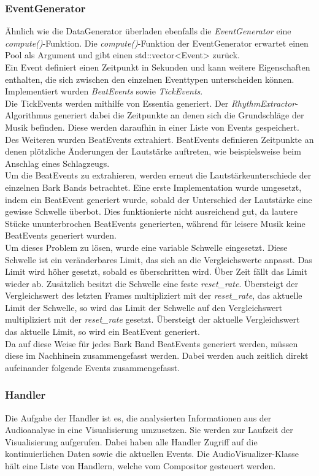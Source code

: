 \documentclass[11pt,a4paper]{article}
\begin{document}
\subsubsection{EventGenerator}
Ähnlich wie die DataGenerator überladen ebenfalls die \textit{EventGenerator} eine \textit{compute()}-Funktion. Die \textit{compute()}-Funktion der EventGenerator erwartet einen Pool als Argument und gibt einen std::vector<Event> zurück.\\
Ein Event definiert einen Zeitpunkt in Sekunden und kann weitere Eigenschaften enthalten, die sich zwischen den einzelnen Eventtypen unterscheiden können. Implementiert wurden \textit{BeatEvents} sowie \textit{TickEvents}.\\
Die TickEvents werden mithilfe von Essentia generiert. Der \textit{RhythmExtractor}-Algorithmus generiert dabei die Zeitpunkte an denen sich die Grundschläge der Musik befinden. Diese werden daraufhin in einer Liste von Events gespeichert.\\
Des Weiteren wurden BeatEvents extrahiert. BeatEvents definieren Zeitpunkte an denen plötzliche Änderungen der Lautstärke auftreten, wie beispielsweise beim Anschlag eines Schlagzeugs.\\
Um die BeatEvents zu extrahieren, werden erneut die Lautstärkeunterschiede der einzelnen Bark Bands betrachtet. Eine erste Implementation wurde umgesetzt, indem ein BeatEvent generiert wurde, sobald der Unterschied der Lautstärke eine gewisse Schwelle überbot. Dies funktionierte nicht ausreichend gut, da lautere Stücke ununterbrochen BeatEvents generierten, während für leisere Musik keine BeatEvents generiert wurden.\\
Um dieses Problem zu lösen, wurde eine variable Schwelle eingesetzt. Diese Schwelle ist ein veränderbares Limit, das sich an die Vergleichswerte anpasst. Das Limit wird höher gesetzt, sobald es überschritten wird. Über Zeit fällt das Limit wieder ab. Zusätzlich besitzt die Schwelle eine feste \textit{reset\_rate}. Übersteigt der Vergleichswert des letzten Frames multipliziert mit der \textit{reset\_rate}, das aktuelle Limit der Schwelle, so wird das Limit der Schwelle auf den Vergleichswert multipliziert mit der \textit{reset\_rate} gesetzt. Übersteigt der aktuelle Vergleichswert das aktuelle Limit, so wird ein BeatEvent generiert.\\
Da auf diese Weise für jedes Bark Band BeatEvents generiert werden, müssen diese im Nachhinein zusammengefasst werden. Dabei werden auch zeitlich direkt aufeinander folgende Events zusammengefasst.
\subsubsection{Handler}
Die Aufgabe der Handler ist es, die analysierten Informationen aus der Audioanalyse in eine Visualisierung umzusetzen. Sie werden zur Laufzeit der Visualisierung aufgerufen. Dabei haben alle Handler Zugriff auf die kontinuierlichen Daten sowie die aktuellen Events. Die AudioVisualizer-Klasse hält eine Liste von Handlern, welche vom Compositor gesteuert werden.
\end{document}
